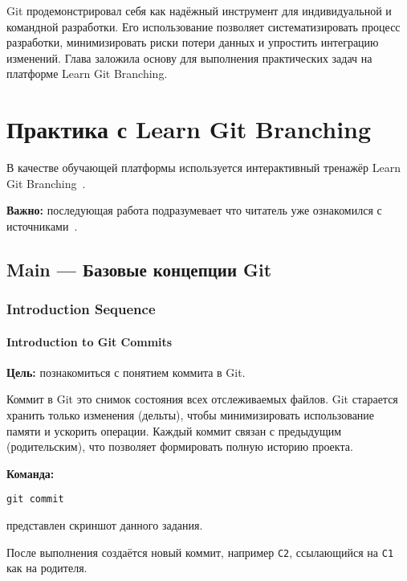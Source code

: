 \documentclass[a4paper,12pt]{report}
\begin{document}
Git продемонстрировал себя как надёжный инструмент для индивидуальной и командной разработки. Его использование позволяет систематизировать процесс разработки, минимизировать риски потери данных и упростить интеграцию изменений. Глава заложила основу для выполнения практических задач на платформе Learn Git Branching.


\chapter{Практика с Learn Git Branching}\label{git_branching_practice}

В качестве обучающей платформы используется интерактивный тренажёр Learn Git Branching~\cite{learngitbranching}.

\textbf{Важно:} последующая работа подразумевает что читатель уже ознакомился с источниками~\cite{git_official_doc, progit_book, learngitbranching}.

\section{Main — Базовые концепции Git}

\subsection{Introduction Sequence}
\subsubsection{Introduction to Git Commits}
\textbf{Цель:} познакомиться с понятием коммита в Git.

Коммит в Git \textendash{} это снимок состояния всех отслеживаемых файлов. Git старается хранить только изменения (дельты), чтобы минимизировать использование памяти и ускорить операции. Каждый коммит связан с предыдущим (родительским), что позволяет формировать полную историю проекта.

\textbf{Команда:}
\begin{verbatim}
git commit
\end{verbatim}

 представлен скриншот данного задания.

После выполнения создаётся новый коммит, например \texttt{C2}, ссылающийся на \texttt{C1} как на родителя.
\end{document}
